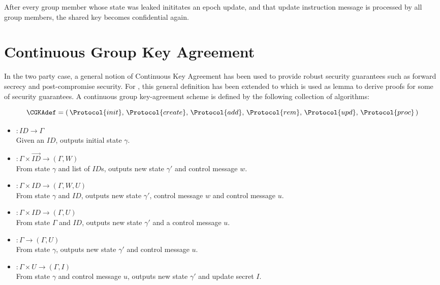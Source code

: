 \begin{definition}
After every group member whose state was leaked inititates an epoch update, and that update instruction message is processed by all group members, the shared key becomes confidential again.
\end{definition}


\hypertarget{sec:CGKA}{%
\section{Continuous Group Key Agreement}\label{sec:CGKA}}

In the two party case, a general notion of Continuous Key Agreement \autocite{alwen2019double} has been used to provide robust security guarantees such as forward secrecy and post-compromise security.
For , this general definition has been extended to  \autocite{alwen2020security} which is used as lemma to derive proofs for some of  security guarantees.
A continuous group key-agreement scheme is defined by the following collection of algorithms:

\[ \CGKAdef = \left(\,\Protocol{init},\, \Protocol{create},\, \Protocol{add},\, \Protocol{rem},\, \Protocol{upd},\, \Protocol{proc}\,\right) \]

\begin{itemize}
\item {}   \(: ID \to \Gamma\)\\
  Given an \(ID\), outputs initial state \(\gamma\).
\item {} \(: \Gamma \times \overrightarrow{ID} \to (\Gamma, W)\)\\
  From state \(\gamma\) and list of \(ID\)s, outputs new state \(\gamma'\) and control message \(w\).
\item {}    \(: \Gamma \times ID \to (\Gamma, W, U)\)\\
  From state \(\gamma\) and \(ID\), outputs new state \(\gamma'\), control message \(w\) and control message \(u\).
\item {}    \(: \Gamma \times ID \to (\Gamma, U)\)\\
  From state \(\Gamma\) and \(ID\), outputs new state \(\gamma'\) and a control message \(u\).
\item {}    \(: \Gamma \to (\Gamma, U)\)\\
  From state \(\gamma\), outputs new state \(\gamma'\) and control message \(u\).
\item {}   \(: \Gamma \times U \to (\Gamma, I)\)\\
  From state \(\gamma\) and control message \(u\), outputs new state \(\gamma'\) and update secret \(I\).
\end{itemize}

